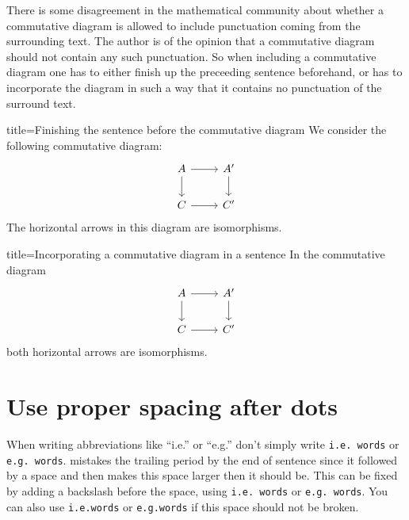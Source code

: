 There is some disagreement in the mathematical community about whether a commutative diagram is allowed to include punctuation coming from the surrounding text.
The author is of the opinion that a commutative diagram should not contain any such punctuation.
So when including a commutative diagram one has to either finish up the preceeding sentence beforehand, or has to incorporate the diagram in such a way that it contains no punctuation of the surround text.
\begin{tcblisting}{title={Finishing the sentence before the commutative diagram}}
  We consider the following commutative diagram:
  \[
    \begin{tikzcd}
        A
        \arrow{r}
        \arrow{d}
      &
        A'
        \arrow{d}
      \\
        C
        \arrow{r}
      &
        C'  
    \end{tikzcd}
  \]
  The horizontal arrows in this diagram are isomorphisms.
\end{tcblisting}
\begin{tcblisting}{title={Incorporating a commutative diagram in a sentence}}
  In the commutative diagram
    \[
    \begin{tikzcd}
        A
        \arrow{r}
        \arrow{d}
      &
        A'
        \arrow{d}
      \\
        C
        \arrow{r}
      &
        C'  
    \end{tikzcd}
  \]
  both horizontal arrows are isomorphisms.
\end{tcblisting}





\section{Use proper spacing after dots}

When writing abbreviations like \enquote{i.e.} or \enquote{e.g.} don’t simply write \texttt{i.e. words} or \texttt{e.g. words}.
 mistakes the trailing period by the end of sentence since it followed by a space and then makes this space larger then it should be.
This can be fixed by adding a backslash before the space, using \texttt{i.e.{\tbs} words} or \texttt{e.g.{\tbs} words}.
You can also use \texttt{i.e.{\customtexttilde}words} or \texttt{e.g.{\customtexttilde}words} if this space should not be broken.





